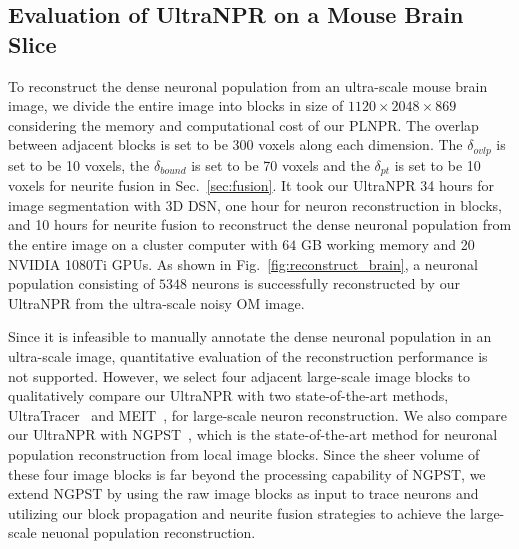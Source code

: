 \subsection{Evaluation of UltraNPR on a Mouse Brain Slice}
\label{sec:exp_UltraNPR}

To reconstruct the dense neuronal population from an ultra-scale mouse brain image, we divide the entire image into blocks in size of $1120\times 2048\times 869$ considering the memory and computational cost of our PLNPR.
%
The overlap between adjacent blocks is set to be $300$ voxels along each dimension. 
The $\delta_{ovlp}$ is set to be 10 voxels, the $\delta_{bound}$ is set to be 70 voxels and the $\delta_{pt}$ is set to be 10 voxels for neurite fusion in Sec.~\ref{sec:fusion}.
%
It took our UltraNPR 34 hours for image segmentation with 3D DSN, one hour for neuron reconstruction in blocks, and 10 hours for neurite fusion to reconstruct the dense neuronal population from the entire image on a cluster computer with $64$ GB working memory and 20 NVIDIA 1080Ti GPUs.
%
As shown in Fig.~\ref{fig:reconstruct_brain}, a neuronal population consisting of $5348$ neurons is successfully reconstructed by our UltraNPR from the ultra-scale noisy OM image. 


Since it is infeasible to manually annotate the dense neuronal population in an ultra-scale image, quantitative evaluation of the reconstruction performance is not supported.
%
However, we select four adjacent large-scale image blocks to qualitatively compare our UltraNPR with two state-of-the-art methods, UltraTracer~\cite{Peng2017} and MEIT~\cite{Wang2018}, for large-scale neuron reconstruction.
We also compare our UltraNPR with NGPST~\cite{Quan2015}, which is the state-of-the-art method for neuronal population reconstruction from local image blocks.
Since the sheer volume of these four image blocks is far beyond the processing capability of NGPST, we extend NGPST by using the raw image blocks as input to trace neurons and utilizing our block propagation and neurite fusion strategies to achieve the large-scale neuonal population reconstruction.
%


